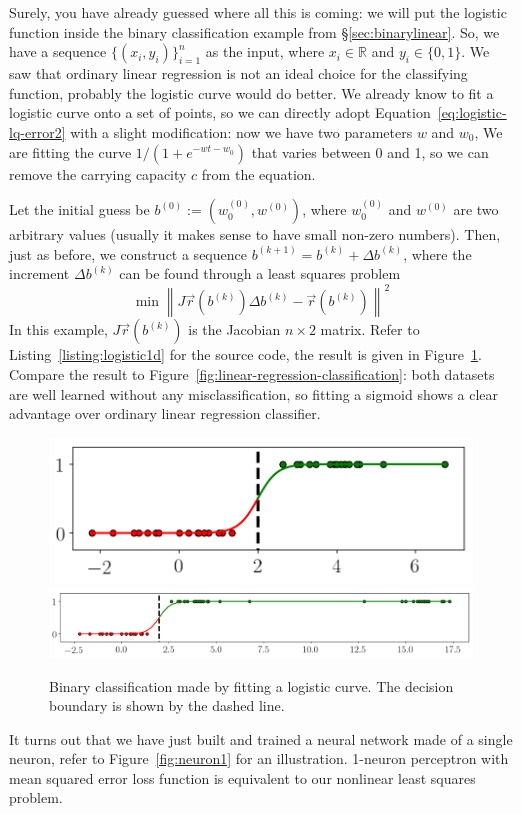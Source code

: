 \documentclass[notitlepage,oneside]{book}
\begin{document}
Surely, you have already guessed where all this is coming: we will put the logistic function inside the binary classification example from \S\ref{sec:binarylinear}.
So, we have a sequence $\{(x_i, y_i)\}_{i=1}^n$ as the input, where $x_i\in\mathbb R$ and $y_i\in \{0,1\}$.
We saw that ordinary linear regression is not an ideal choice for the classifying function,
probably the logistic curve would do better.
We already know to fit a logistic curve onto a set of points,
so we can directly adopt Equation~\eqref{eq:logistic-lq-error2} with a slight modification: now we have two parameters $w$ and $w_0$,
We are fitting the curve $1/(1+e^{-wt - w_0})$ that varies between 0 and 1, so we can remove the carrying capacity $c$ from the equation.

Let the initial guess be $b^{(0)} := \left(w_0^{(0)}, w^{(0)}\right)$, where $w_0^{(0)}$ and $w^{(0)}$ are two arbitrary values (usually it makes sense to have small non-zero numbers).
Then, just as before, we construct a sequence $b^{(k+1)} = b^{(k)} + \Delta b^{(k)}$,
where the increment $\Delta b^{(k)}$ can be found through a least squares problem
$$
\min \left\| J\vec{r}\left(b^{(k)}\right) \Delta b^{(k)} - \vec{r}\left(b^{(k)}\right) \right\|^2
$$
In this example, $J\vec{r}\left(b^{(k)}\right)$ is the Jacobian $n\times 2$ matrix.
Refer to Listing~\ref{listing:logistic1d} for the source code, the result is given in Figure~\ref{fig:logistic-vs-linear}.
Compare the result to Figure~\ref{fig:linear-regression-classification}: both datasets are well learned without any misclassification,
so fitting a sigmoid shows a clear advantage over ordinary linear regression classifier.

\begin{figure}[htb]
    \centering
    \includegraphics[width=.305\linewidth]{img/logistic-1d-a.png}
    \includegraphics[width=.64\linewidth]{img/logistic-1d-b.png}
    \caption{Binary classification made by fitting a logistic curve. The decision boundary is shown by the dashed line.}
    \label{fig:logistic-vs-linear}
\end{figure}

It turns out that we have just built and trained a neural network made of a single neuron, refer to Figure~\ref{fig:neuron1} for an illustration.
1-neuron perceptron with mean squared error loss function is equivalent to our nonlinear least squares problem.
\end{document}
